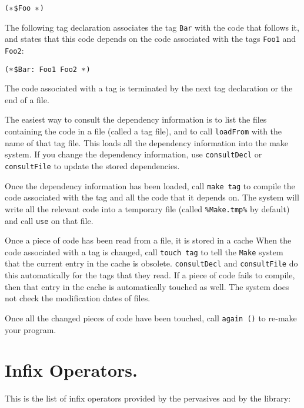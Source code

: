 {\tt ($\mit\ast$\$Foo $\mit\ast$)}

\noindent
The following tag declaration associates the tag {\tt Bar} with the code that
follows it, and states that this code depends on the code associated
with the tags {\tt Foo1} and {\tt Foo2}:

{\tt ($\mit\ast$\$Bar: Foo1 Foo2 $\mit\ast$)}

\noindent
The code associated with a tag is terminated by the next tag declaration
or the end of a file.

The easiest way to consult the dependency information is to list
the files containing the code in a file (called a tag file), and to call
{\tt loadFrom} with the name of that tag file.  This loads all the
dependency
information into the make system.  If you change the dependency
information, use {\tt consultDecl} or {\tt consultFile} to update the stored
dependencies.

Once the dependency information has been loaded, call {\tt make tag} to compile
the code associated with the tag and all the code that it depends on.
The system will write all the relevant code into a temporary file (called
{\tt \%Make.tmp\%} by default) and call {\tt use} on that file.

Once a piece of code has been read from a file, it is stored in a cache
When the code associated with a tag is changed, call {\tt touch tag} to
tell the {\tt Make} system that the current entry in the cache is obsolete.
{\tt consultDecl} and {\tt consultFile} do this automatically for the tags
that they read.  If a piece of code fails to compile, then that entry in
the cache is automatically touched as well.
The system does not check the modification dates of files.

Once all the changed pieces of code have been touched, call {\tt again ()} to
re-make your program.


\section{Infix Operators.}

This is the list of infix operators provided by the pervasives and
by the library:

